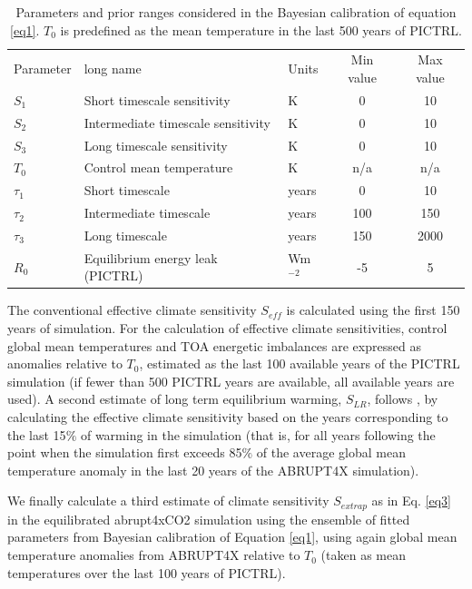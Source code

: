 \documentclass[esd, article]{copernicus}
\begin{document}
\begin{table}[]
    \centering
    \begin{tabular}{l|l|l|c|c}
    Parameter & long name & Units & Min value & Max value \\
    $S_1$ & Short timescale sensitivity & K & 0 & 10 \\
    $S_2$ & Intermediate timescale sensitivity & K & 0 & 10 \\
    $S_3$ & Long timescale sensitivity & K & 0 & 10 \\
    $T_0$ & Control mean temperature & K & n/a & n/a \\
    $\tau_1$ & Short timescale & years & 0 & 10 \\
    $\tau_2$ & Intermediate timescale & years & 100 & 150 \\
    $\tau_3$ & Long timescale & years & 150 & 2000 \\
    $R_0$ & Equilibrium energy leak (PICTRL) & Wm$^{-2}$ & -5 & 5 \\
    \end{tabular}
    \caption{Parameters and prior ranges considered in the Bayesian calibration of equation \ref{eq1}.  $T_0$ is predefined as the mean temperature in the last 500 years of PICTRL. }
    \label{tb1}
\end{table}

The conventional effective climate sensitivity $S_{eff}$ is calculated using the first 150 years of simulation.   For the calculation of effective climate sensitivities, control global mean temperatures and TOA energetic imbalances are expressed as anomalies relative to $T_0$, estimated as the last 100 available years of the PICTRL simulation (if fewer than 500 PICTRL years are available, all available years are used).  A second estimate of long term equilibrium warming, $S_{LR}$, follows \cite{rugenstein2020equilibrium}, by calculating the effective climate sensitivity based on the years corresponding to the last 15$\%$ of warming in the simulation (that is, for all years following the point when the simulation first exceeds 85$\%$ of the average global mean temperature anomaly  in the last 20 years of the ABRUPT4X simulation).

We finally calculate a third estimate of climate sensitivity $S_{extrap}$ as in Eq. \ref{eq3} in the equilibrated abrupt4xCO2 simulation using the ensemble of fitted parameters from Bayesian calibration of Equation \ref{eq1}, using again global mean temperature anomalies from ABRUPT4X relative to $T_0$ (taken as mean temperatures over the last 100 years of PICTRL).  
\end{document}
